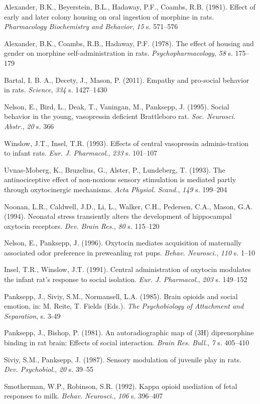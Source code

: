 \documentclass[12pt]{article}
\newcommand{\apaartykul}[6]{#1 (#2). #3. \textit{#4}, \textit{#5} s. #6}
\begin{document}
\apaartykul{Alexander, B.K., Beyerstein, B.L., Hadaway, P.F., Coambs, R.B.}{1981}{Effect of early and later colony housing on oral ingestion of morphine in rats}{Pharmacology Biochemistry and Behavior}{15}{571--576}

\apaartykul{Alexander, B.K., Coambs, R.B., Hadaway, P.F.}{1978}{The effect of housing and gender on morphine self-administration in rats}{Psychopharmacology}{58}{175--179}

\apaartykul{Bartal, I. B. A., Decety, J., Mason, P.}{2011}{Empathy and pro-social behavior in rats}{Science}{334}{1427--1430}

\apaartykul{Nelson, E., Bird, L., Deak, T., Vaningan, M., Panksepp, J.}{1995}{Social behavior in the young, vasopressin deficient Brattleboro rat}{Soc. Neurosci. Abstr.}{20}{366}

\apaartykul{Winslow, J.T., Insel, T.R.}{1993}{Effects of central vasopressin adminis-tration to infant rats}{Eur. J. Pharmacol.}{233}{101–107}

\apaartykul{Uvnas-Moberg, K., Bruzelius, G., Alster, P., Lundeberg, T.}{1993}{The antinociceptive effect of non-noxious sensory stimulation is mediated partly through oxytocinergic mechanisms}{Acta Physiol. Scand.}{149}{199–204}

\apaartykul{Noonan, L.R., Caldwell, J.D., Li, L., Walker, C.H., Pedersen, C.A., Mason, G.A.}{1994}{Neonatal stress transiently alters the development of hippocampal oxytocin receptors}{Dev. Brain Res.}{80}{115–120}

\apaartykul{Nelson, E., Panksepp, J.}{1996}{Oxytocin mediates acquisition of maternally associated odor preference in preweanling rat pups}{Behav. Neurosci.}{110}{1–10}

\apaartykul{ Insel, T.R., Winslow, J.T.}{1991}{Central administration of oxytocin modulates the infant rat’s response to social isolation}{Eur. J. Pharmacol.}{203}{149–152}

\apaartykul{Panksepp, J., Siviy, S.M., Normansell, L.A.}{1985}{Brain opioids and social emotion, in: M. Reite, T. Fields (Eds.)}{The Psychobiology of Attachment and Separation}{}{3-49}

\apaartykul{Panksepp, J., Bishop, P.}{1981}{An autoradiographic map of (3H) diprenorphine binding in rat brain: Effects of social interaction}{Brain Res. Bull.}{7}{405–410}

\apaartykul{Siviy, S.M., Panksepp, J.}{1987}{Sensory modulation of juvenile play in rats}{Dev. Psychobiol.}{20}{39–55}

\apaartykul{Smotherman, W.P., Robinson, S.R.}{1992}{Kappa opioid mediation of fetal responses to milk}{Behav. Neurosci.}{106}{396–407}
\end{document}
